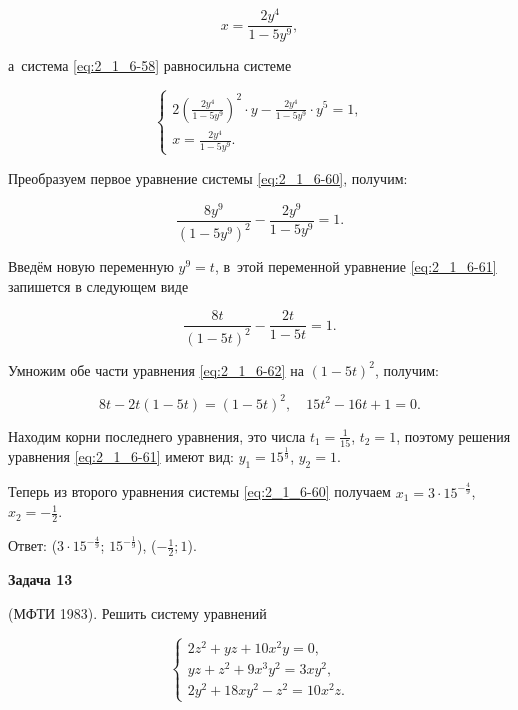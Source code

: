 \begin{equation}\label{eq:2_1_6-59}
x = \frac{2y^{4}}{1 - 5y^{9}},
\end{equation}

\noindent
а~система \eqref{eq:2_1_6-58} равносильна системе

\begin{equation}\label{eq:2_1_6-60}
\begin{cases}
\displaystyle 2
\left( \frac{2y^{4}}{1 - 5y^{9}} \right)^{2} \cdot y -
\frac{2y^{4}}{1 - 5y^{9}} \cdot y^{5} =
1, \\[15pt]
\displaystyle x = \frac{2y^{4}}{1 - 5y^{9}}.
\end{cases}
\end{equation}

\noindent
Преобразуем первое уравнение системы \eqref{eq:2_1_6-60}, получим:

\begin{equation}\label{eq:2_1_6-61}
\frac{8y^{9}}{(1 - 5y^{9})^{2}} -
\frac{2y^{9}}{1 - 5y^{9}} =
1.
\end{equation}

\noindent
Введём новую переменную $y^{9} = t$, в~этой переменной уравнение \eqref{eq:2_1_6-61}
запишется в следующем виде

\begin{equation}\label{eq:2_1_6-62}
\frac{8t}{(1 - 5t)^{2}} -
\frac{2t}{1 - 5t} =
1.
\end{equation}

\noindent
Умножим обе части уравнения \eqref{eq:2_1_6-62} на $(1 - 5t)^{2}$, получим:

\begin{equation*}
8t - 2t(1 - 5t) = (1 - 5t)^{2}, \quad 15t^{2} - 16t + 1 = 0.
\end{equation*}

\noindent
Находим корни последнего уравнения, это числа 
$\displaystyle t_{1} = \frac{1}{15}$, $\displaystyle t_{2} = 1$,
поэтому решения уравнения \eqref{eq:2_1_6-61} имеют вид:
$y_1 = 15^{\frac{1}{9}}$, $y_{2} = 1$.

Теперь из второго уравнения системы \eqref{eq:2_1_6-60} получаем
$x_{1} = 3 \cdot 15^{-\frac{4}{9}}$, $\displaystyle x_{2} = -\frac{1}{2}$.

Ответ:
($3 \cdot 15^{-\frac{4}{9}}$; $15^{-\frac{1}{9}}$),
($\displaystyle -\frac{1}{2}; {1}$).

\hypertarget{ex:2_1_6_13}{\textbf{Задача 13}} (МФТИ 1983). Решить систему уравнений

\begin{equation}\label{eq:2_1_6-63}
\begin{cases} 
2z^{2} + yz + 10x^{2}y = 0, \\
yz + z^{2} + 9x^{3}y^{2} = 3 xy^{2}, \\
2y^{2} + 18xy^{2} - z^{2} = 10x^{2}z.
\end{cases} 
\end{equation}

